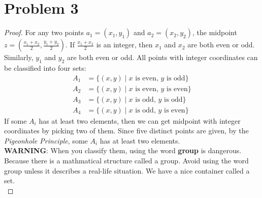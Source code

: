 \section*{Problem 3}
	\begin{proof}
		For any two points $a_1 = (x_1, y_1)$ and $a_2 = (x_2, y_2)$, the midpoint $z = (\frac{x_1 + x_2}{2}, \frac{y_1 + y_2}{2})$. If $\frac{x_1 + x_2}{2}$ is an integer, then $x_1$ and $x_2$ are both even or odd. Similarly, $y_1$ and $y_2$ are both even or odd. All points with integer coordinates can be classified into four sets:
		\begin{align*}
			A_1 &= \{(x, y) \mid x\mbox{ is even, } y\mbox{ is odd}\}\\
			A_2 &= \{(x, y) \mid x\mbox{ is even, } y\mbox{ is even}\}\\
			A_3 &= \{(x, y) \mid x\mbox{ is odd, } y\mbox{ is odd}\}\\
			A_4 &= \{(x, y) \mid x\mbox{ is odd, } y\mbox{ is even}\}
		\end{align*}
		If some $A_i$ has at least two elements, then we can get midpoint with integer coordinates by picking two of them. Since five distinct points are given, by the \textit{Pigeonhole Principle}, some $A_i$ has at least two elements.\\
		{\color{orange} \textbf{WARNING}}: When you classify them, using the word \textbf{group} is dangerous. Because there is a mathmatical structure called a group. Avoid using the word group unless it describes a real-life situation. We have a nice container called a set.\\
	\end{proof}
